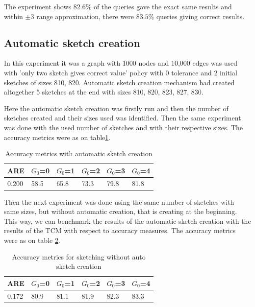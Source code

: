 \documentclass[conference]{IEEEtran}
\begin{document}
The experiment shows $82.6\%$ of the queries gave the exact same results and within $\pm3$ range approximation, there were $83.5\%$ queries giving correct results.


\subsection{Automatic sketch creation} 
In this experiment it was a graph with 1000 nodes and 10,000 edges was used with 'only two sketch gives correct value' policy with 0 tolerance and 2 initial sketches of sizes 810, 820. Automatic sketch creation mechanism had created altogether 5 sketches at the end with sizes 810, 820, 823, 827, 830.


Here the automatic sketch creation was firstly run and then the number of sketches created and their sizes used was identified. Then the same experiment was done with the used number of sketches and with their respective sizes. The accuracy metrics were as on table\ref{table:Accuracy metrics with automatic sketch creation}.


\begin{table}[!b]
\caption{Accuracy metrics with automatic sketch creation}
\label{table:Accuracy metrics with automatic sketch creation}
\centering
\begin{tabular}{|l|l|l|l|l|l|}
\hline
 ARE   & $G_0$=0 & $G_0$=1 & $G_0$=2 &  $G_0$=3 & $G_0$=4 \\ \hline
0.200 &   58.5  &  65.8   &   73.3  &   79.8   &   81.8 \\ \hline
\end{tabular}
\end{table}

Then the next experiment was done using the same number of sketches with same sizes, but without automatic creation, that is creating at the beginning. This way, we can benchmark the results of the automatic sketch creation with the results of the TCM with respect to accuracy measures. The accuracy metrics were as on table \ref{table:Accuracy metrics for sketching without auto sketch creation}.

\begin{table}[!b]
\caption{Accuracy metrics for sketching without auto sketch creation}
\label{table:Accuracy metrics for sketching without auto sketch creation}
\centering
\begin{tabular}{|l|l|l|l|l|l|}
\hline
 ARE   & $G_0$=0 & $G_0$=1 & $G_0$=2 & $G_0$=3 & $G_0$=4\\ \hline
0.172 &   80.9  &   81.1  &   81.9  &   82.3  & 83.3   \\ \hline
\end{tabular}
\end{table}
\end{document}
